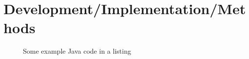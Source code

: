 \chapter{Development/Implementation/Methods}

\lipsum[1]

\begin{figure}[h]
	\lstset{language=Java}
	
	\caption{Some example Java code in a listing}
\end{figure}
